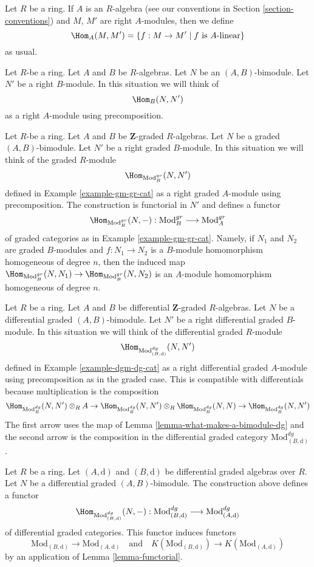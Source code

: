 \noindent
Let $R$ be a ring. If $A$ is an $R$-algebra (see our conventions
in Section \ref{section-conventions}) and $M$, $M'$ are right
$A$-modules, then we define
$$
\Hom_A(M, M') = \{f : M \to M' \mid f \text{ is }A\text{-linear}\}
$$
as usual.

\medskip\noindent
Let $R$-be a ring. Let $A$ and $B$ be $R$-algebras. Let
$N$ be an $(A, B)$-bimodule. Let $N'$ be a right $B$-module.
In this situation we will think of
$$
\Hom_B(N, N')
$$
as a right $A$-module using precomposition.

\medskip\noindent
Let $R$-be a ring. Let $A$ and $B$ be $\mathbf{Z}$-graded $R$-algebras. Let
$N$ be a graded $(A, B)$-bimodule. Let $N'$ be a right graded $B$-module.
In this situation we will think of the graded $R$-module
$$
\Hom_{\text{Mod}^{gr}_B}(N, N')
$$
defined in Example \ref{example-gm-gr-cat} as a right graded $A$-module
using precomposition. The construction is functorial in $N'$ and defines
a functor
$$
\Hom_{\text{Mod}^{gr}_B}(N, -) :
\text{Mod}^{gr}_B
\longrightarrow
\text{Mod}^{gr}_A
$$
of graded categories as in Example \ref{example-gm-gr-cat}. Namely, if
$N_1$ and $N_2$ are graded $B$-modules and $f : N_1 \to N_2$ is a $B$-module
homomorphism homogeneous of degree $n$, then the induced map
$\Hom_{\text{Mod}^{gr}_B}(N, N_1) \to \Hom_{\text{Mod}^{gr}_B}(N, N_2)$
is an $A$-module homomorphism homogeneous of degree $n$.

\medskip\noindent
Let $R$ be a ring. Let $A$ and $B$ be differential $\mathbf{Z}$-graded
$R$-algebras. Let $N$ be a differential graded $(A, B)$-bimodule.
Let $N'$ be a right differential graded $B$-module. In this situation
we will think of the differential graded $R$-module
$$
\Hom_{\text{Mod}^{dg}_{(B, \text{d})}}(N, N')
$$
defined in Example \ref{example-dgm-dg-cat} as a right differential
graded $A$-module using precomposition as in the graded case. This
is compatible with differentials because multiplication is the
composition
$$
\Hom_{\text{Mod}^{dg}_B}(N, N') \otimes_R A \to
\Hom_{\text{Mod}^{dg}_B}(N, N') \otimes_R
\Hom_{\text{Mod}^{dg}_B}(N, N) \to
\Hom_{\text{Mod}^{dg}_B}(N, N')
$$
The first arrow uses the map
of Lemma \ref{lemma-what-makes-a-bimodule-dg} and the second
arrow is the composition in the differential graded category
$\text{Mod}^{dg}_{(B, \text{d})}$.

\begin{lemma}
\label{lemma-hom}
Let $R$ be a ring. Let $(A, \text{d})$ and $(B, \text{d})$
be differential graded algebras over $R$. Let $N$ be a
differential graded $(A, B)$-bimodule. The construction above
defines a functor
$$
\Hom_{\text{Mod}^{dg}_{(B, \text{d})}}(N, -) :
\text{Mod}^{dg}_{(B, \text{d})}
\longrightarrow
\text{Mod}^{dg}_{(A, \text{d})}
$$
of differential graded categories. This functor induces functors
$$
\text{Mod}_{(B, \text{d})} \to \text{Mod}_{(A, \text{d})}
\quad\text{and}\quad
K(\text{Mod}_{(B, \text{d})}) \to K(\text{Mod}_{(A, \text{d})})
$$
by an application of Lemma \ref{lemma-functorial}.
\end{lemma}

